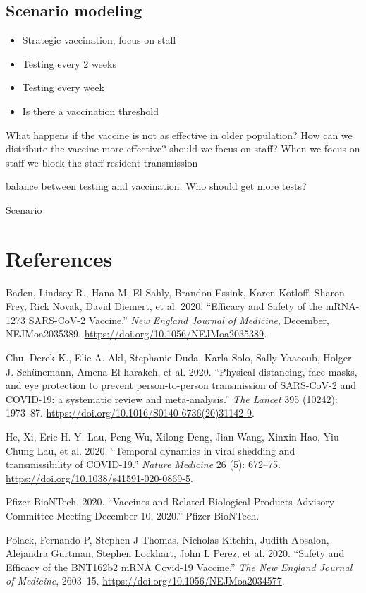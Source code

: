\documentclass[
]{article}
\providecommand{\tightlist}{%
  \setlength{\itemsep}{0pt}\setlength{\parskip}{0pt}}
\newlength{\cslhangindent}
\newenvironment{cslreferences}%
  {\setlength{\parindent}{0pt}%
  \everypar{\setlength{\hangindent}{\cslhangindent}}\ignorespaces}%
  {\par}
\begin{document}
\hypertarget{scenario-modeling-1}{%
\subsection{Scenario modeling}\label{scenario-modeling-1}}

\begin{itemize}
\tightlist
\item
  Strategic vaccination, focus on staff
\item
  Testing every 2 weeks
\item
  Testing every week
\item
  Is there a vaccination threshold
\end{itemize}

What happens if the vaccine is not as effective in older population? How
can we distribute the vaccine more effective? should we focus on staff?
When we focus on staff we block the staff resident transmission

balance between testing and vaccination. Who should get more tests?

\textbar Scenario\textbar{}

\hypertarget{references}{%
\section*{References}\label{references}}

\hypertarget{refs}{}
\begin{cslreferences}
\leavevmode\hypertarget{ref-Baden2020}{}%
Baden, Lindsey R., Hana M. El Sahly, Brandon Essink, Karen Kotloff,
Sharon Frey, Rick Novak, David Diemert, et al. 2020. ``Efficacy and
Safety of the mRNA-1273 SARS-CoV-2 Vaccine.'' \emph{New England Journal
of Medicine}, December, NEJMoa2035389.
\url{https://doi.org/10.1056/NEJMoa2035389}.

\leavevmode\hypertarget{ref-Chu2020}{}%
Chu, Derek K., Elie A. Akl, Stephanie Duda, Karla Solo, Sally Yaacoub,
Holger J. Schünemann, Amena El-harakeh, et al. 2020. ``Physical
distancing, face masks, and eye protection to prevent person-to-person
transmission of SARS-CoV-2 and COVID-19: a systematic review and
meta-analysis.'' \emph{The Lancet} 395 (10242): 1973--87.
\url{https://doi.org/10.1016/S0140-6736(20)31142-9}.

\leavevmode\hypertarget{ref-He2020}{}%
He, Xi, Eric H. Y. Lau, Peng Wu, Xilong Deng, Jian Wang, Xinxin Hao, Yiu
Chung Lau, et al. 2020. ``Temporal dynamics in viral shedding and
transmissibility of COVID-19.'' \emph{Nature Medicine} 26 (5): 672--75.
\url{https://doi.org/10.1038/s41591-020-0869-5}.

\leavevmode\hypertarget{ref-Pfizer2020}{}%
Pfizer-BioNTech. 2020. ``Vaccines and Related Biological Products
Advisory Committee Meeting December 10, 2020.'' Pfizer-BioNTech.

\leavevmode\hypertarget{ref-Polack2020}{}%
Polack, Fernando P, Stephen J Thomas, Nicholas Kitchin, Judith Absalon,
Alejandra Gurtman, Stephen Lockhart, John L Perez, et al. 2020. ``Safety
and Efficacy of the BNT162b2 mRNA Covid-19 Vaccine.'' \emph{The New
England Journal of Medicine}, 2603--15.
\url{https://doi.org/10.1056/NEJMoa2034577}.
\end{cslreferences}
\end{document}
